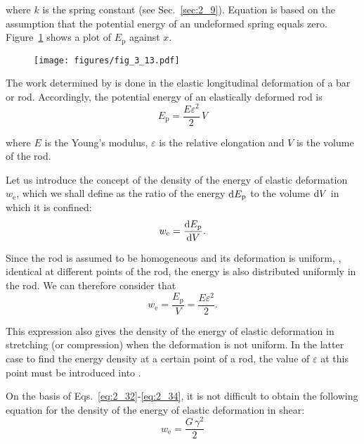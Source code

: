 \noindent
where $k$ is the spring constant (see Sec.~\ref{sec:2_9}). Equation  is based on the assumption that the potential energy of an undeformed spring equals zero. Figure~\ref{fig:3_13} shows a plot of $E_{\text{p}}$ against $x$.

\begin{figure}[t]
	\begin{center}
		\texttt{[image: figures/fig\_3\_13.pdf]}
		\caption[]{}
		\label{fig:3_13}
	\end{center}
	\vspace{-0.7cm}
\end{figure}

The work determined by  is done in the elastic longitudinal deformation of a bar or rod. Accordingly, the potential energy of an elastically deformed rod is
\begin{equation}\label{eq:3_79}
E_{\text{p}} = \frac{E\varepsilon^2}{2}\,V
\end{equation}

\noindent
where $E$ is the Young's modulus, $\varepsilon$ is the relative elongation and $V$ is the volume of the rod.

Let us introduce the concept of the density of the energy of elastic deformation $w_{\text{e}}$, which we shall define as the ratio of the energy $\mathrm{d} E_{\text{p}}$ to the volume $\mathrm{d} V$ in which it is confined:
\begin{equation}\label{eq:3_80}
w_{\text{e}} = \frac{\mathrm{d} E_{\text{p}}}{\mathrm{d} V}.
\end{equation}

\noindent
Since the rod is assumed to be homogeneous and its deformation is uniform, \ie, identical at different points of the rod, the energy  is also distributed uniformly in the rod. We can therefore consider that
\begin{equation}\label{eq:3_81}
w_{\text{e}} = \frac{E_{\text{p}}}{V} = \frac{E\varepsilon^2}{2}.
\end{equation}

\noindent
This expression also gives the density of the energy of elastic deformation in stretching (or compression) when the deformation is not uniform. In the latter case to find the energy density at a certain point of a rod, the value of $\varepsilon$ at this point must be introduced into .

On the basis of Eqs.~\eqref{eq:2_32}-\eqref{eq:2_34}, it is not difficult to obtain the following equation for the density of the energy of elastic deformation in shear:
\begin{equation}\label{eq:3_82}
w_{\text{e}} = \frac{G\,\gamma^2}{2}
\end{equation}


